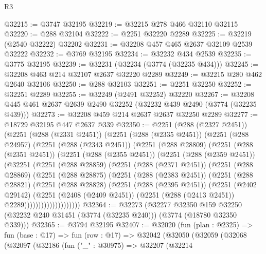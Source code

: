 \begin{lexlean}{R3}
\begin{coremodule}
@32215 := @3747 @32195
@32219 := @32215 @278 @466 @32110 @32115
@32220 := @288 @32104
@32222 := @2251 @32220 @2289
@32225 := @32219 (@2540 @32222) @32202
@32231 := @32208 @457 @465 @2637 @32109 @2539 @32222
@32232 := @3769 @32195
@32234 := @32232 @434 @2539
@32235 := @3775 @32195
@32239 := @32231 (@32234 (@3774 (@32235 @434)))
@32245 := @32208 @463 @214 @32107 @2637 @32220 @2289
@32249 := @32215 @280 @462 @2640 @32106
@32250 := @288 @32103
@32251 := @2251 @32250
@32252 := @32251 @2289
@32255 := @32249 (@2491 @32252) @32220
@32267 := @32208 @445 @461 @2637 @2639 @2490 @32252 (@32232 @439 @2490 (@3774 (@32235 @439)))
@32273 := @32208 @459 @214 @2637 @2637 @32250 @2289
@32277 := @18729 @32195 @447 @2637 @339
@32350 := @2251
    (@288 (@2327 @2451))
    (@2251
      (@288 (@2331 @2451))
      (@2251
        (@288 (@2335 @2451))
        (@2251
          (@288 @24957)
          (@2251
            (@288 (@2343 @2451))
            (@2251
              (@288 @28809)
              (@2251
                (@288 (@2351 @2451))
                (@2251
                  (@288 (@2355 @2451))
                  (@2251
                    (@288 (@2359 @2451))
                    (@32251
                      (@2251
                        (@288 @28859)
                        (@2251
                          (@288 (@2371 @2451))
                          (@2251
                            (@288 @28869)
                            (@2251
                              (@288 @28875)
                              (@2251
                                (@288 (@2383 @2451))
                                (@2251
                                  (@288 @28821)
                                  (@2251
                                    (@288 @28828)
                                    (@2251
                                      (@288 (@2395 @2451))
                                      (@2251
                                        (@2402 @29142)
                                        (@2251
                                          (@2408 (@2409 @2451))
                                          (@2251 (@288 (@2413 @2451)) @2289))))))))))))))))))))
@32364 := @32273
    (@32277
      @32350
      @159
      @32250
      (@32232 @240 @31451 (@3774 (@32235 @240)))
      (@3774 (@18780 @32350 @339)))
@32365 := @3794 @32195
@32407 := @32020
    (fun (plan : @2325) =>
    fun (base : @17) =>
    fun (row : @17) =>
    @32042
      (@32050
        (@32059
          (@32068
            (@32097
              (@32186
                (fun ("_" : @30975) =>
                @32207
                  (@32214

\end{coremodule}
\end{lexlean}
